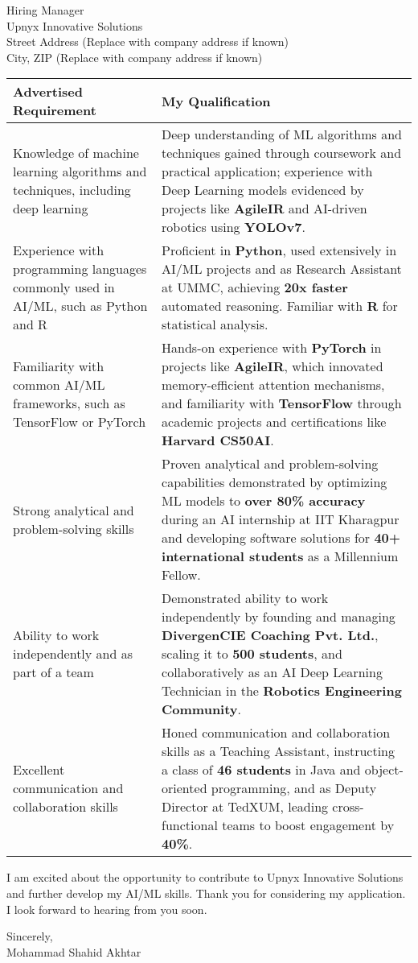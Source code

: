 \documentclass[10.5pt]{letter}
\begin{document}
\begin{letter}{Hiring Manager\\Upnyx Innovative Solutions\\Street Address (Replace with company address if known)\\City, ZIP (Replace with company address if known)}
\renewcommand{\arraystretch}{1.4}
\begin{tabularx}{\textwidth}{@{}p{}X@{}}
\textbf{Advertised Requirement} & \textbf{My Qualification} \\
\hline
Knowledge of machine learning algorithms and techniques, including deep learning & Deep understanding of ML algorithms and techniques gained through coursework and practical application; experience with Deep Learning models evidenced by projects like \textbf{AgileIR} and AI-driven robotics using \textbf{YOLOv7}. \\
Experience with programming languages commonly used in AI/ML, such as Python and R & Proficient in \textbf{Python}, used extensively in AI/ML projects and as Research Assistant at UMMC, achieving \textbf{20x faster} automated reasoning. Familiar with \textbf{R} for statistical analysis. \\
Familiarity with common AI/ML frameworks, such as TensorFlow or PyTorch & Hands-on experience with \textbf{PyTorch} in projects like \textbf{AgileIR}, which innovated memory-efficient attention mechanisms, and familiarity with \textbf{TensorFlow} through academic projects and certifications like \textbf{Harvard CS50AI}. \\
Strong analytical and problem-solving skills & Proven analytical and problem-solving capabilities demonstrated by optimizing ML models to \textbf{over 80\% accuracy} during an AI internship at IIT Kharagpur and developing software solutions for \textbf{40+ international students} as a Millennium Fellow. \\
Ability to work independently and as part of a team & Demonstrated ability to work independently by founding and managing \textbf{DivergenCIE Coaching Pvt. Ltd.}, scaling it to \textbf{500 students}, and collaboratively as an AI Deep Learning Technician in the \textbf{Robotics Engineering Community}. \\
Excellent communication and collaboration skills & Honed communication and collaboration skills as a Teaching Assistant, instructing a class of \textbf{46 students} in Java and object-oriented programming, and as Deputy Director at TedXUM, leading cross-functional teams to boost engagement by \textbf{40\%}. \\
\end{tabularx}

\vspace{0.5cm}
I am excited about the opportunity to contribute to Upnyx Innovative Solutions and further develop my AI/ML skills. Thank you for considering my application. I look forward to hearing from you soon.

\vspace{0.5cm}

\begin{flushleft}
\vspace{0.3cm}
Sincerely,\\[2ex]
Mohammad Shahid Akhtar
\end{flushleft}

\end{letter}
\end{document}

